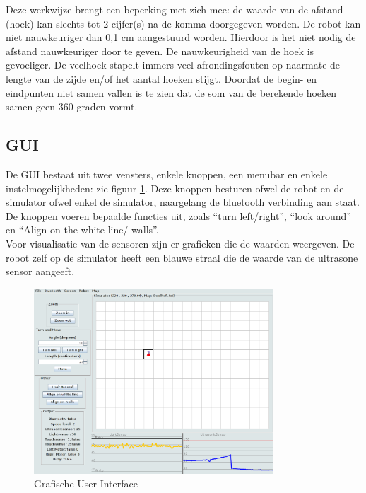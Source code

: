 \documentclass[tt3]{penoverslag}
\begin{document}
Deze werkwijze brengt een beperking met zich mee: de waarde van de afstand (hoek) kan slechts tot 2 cijfer(s) na de komma doorgegeven worden. De robot kan niet nauwkeuriger dan 0,1 cm aangestuurd worden. Hierdoor is het niet nodig de afstand nauwkeuriger door te geven. De nauwkeurigheid van de hoek is gevoeliger. De veelhoek stapelt immers veel afrondingsfouten op naarmate de lengte van de zijde en/of het aantal hoeken stijgt. Doordat de begin- en eindpunten niet samen vallen is te zien dat de som van de berekende hoeken samen geen 360 graden vormt. 

\subsection{GUI} %
\label{ssec:GUI}
De GUI bestaat uit twee vensters, enkele knoppen, een menubar en enkele instelmogelijkheden: zie figuur \ref{fig:gui}. Deze knoppen besturen ofwel de robot en de simulator ofwel enkel de simulator, naargelang de bluetooth verbinding aan staat. De knoppen voeren bepaalde functies uit, zoals ``turn left/right'', ``look around'' en ``Align on the white line/ walls''.\\

Voor visualisatie van de sensoren zijn er grafieken die de waarden weergeven. De robot zelf op de simulator heeft een blauwe straal die de waarde van de ultrasone sensor aangeeft. 

\begin{figure}[tbp]
\begin{center}
    \includegraphics[width=0.8\textwidth]{GUI}
    \caption{Grafische User Interface}
	\label{fig:gui}
\end{center}
\end{figure}
\end{document}
